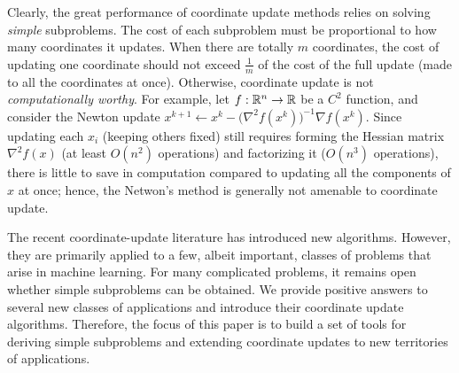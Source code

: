 
Clearly, the great performance of coordinate
update methods relies on solving \emph{simple} subproblems. The cost of each subproblem must be proportional to how many coordinates it updates. %
When there are totally $m$ coordinates, the cost of updating one coordinate should not exceed $\frac{1}{m}$ of the cost of the full update (made to all the coordinates at once). Otherwise, coordinate update is not \emph{computationally worthy}. For example, let  $f:\mathbb{R}^n\to \mathbb{R}$ be  a $C^2$ function, and consider the Newton update  $x^{k+1} \gets x^k - \big(\nabla^2 f(x^k)\big)^{-1}\nabla f(x^k)$. Since updating each $x_i$ (keeping others  fixed) still requires forming the Hessian matrix $\nabla^2 f(x)$ (at least $O(n^2)$ operations) and factorizing it ($O(n^3)$ operations), there is little to save in computation compared to updating all the components of $x$ at once; hence, the Netwon's method is generally not amenable to coordinate update. 

The recent coordinate-update literature has introduced new algorithms. However, they are primarily applied to a few, albeit important, classes of problems  that arise in machine learning. For many complicated problems,  it remains open whether simple subproblems can be obtained. We provide positive answers to several new classes of applications and introduce their coordinate update algorithms. %
Therefore, the focus of this paper is to build a set of tools for deriving simple subproblems and extending  coordinate updates to new territories of applications.

